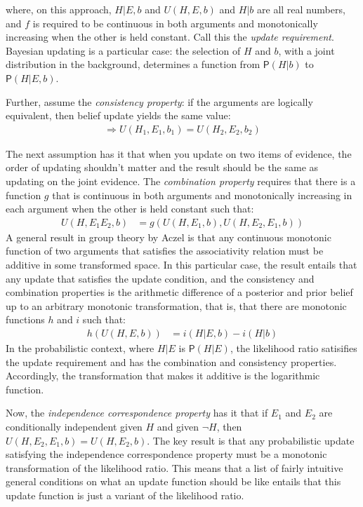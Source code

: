 \documentclass[
  10pt,
  dvipsnames,enabledeprecatedfontcommands]{scrartcl}
\newcommand{\n}{\neg}
\newcommand{\pr}[1]{\mathsf{P}(#1)}
\begin{document}
\noindent where, on this approach, \(H \vert E, b\) and \(U(H,E,b)\) and
\(H \vert b\) are all real numbers, and \(f\) is required to be
continuous in both arguments and monotonically increasing when the other
is held constant. Call this the \textit{update requirement}. Bayesian
updating is a particular case: the selection of \(H\) and \(b\), with a
joint distribution in the background, determines a function from
\(\pr{H \vert b}\) to \(\pr{H \vert E, b}\).

Further, assume the \textit{consistency property}: if the arguments are
logically equivalent, then belief update yields the same value:
\begin{align*}
[H_1 \Leftrightarrow H_2, E_1 \Leftrightarrow E_2] \Rightarrow U(H_1, E_1, b_1) = U(H_2, E_2, b_2)
\end{align*}

\noindent The next assumption has it that when you update on two items
of evidence, the order of updating shouldn't matter and the result
should be the same as updating on the joint evidence. The
\textit{combination property} requires that there is a function \(g\)
that is continuous in both arguments and monotonically increasing in
each argument when the other is held constant such that: \begin{align*}
U(H, E_1E_2,b) & =  g(U(H,E_1, b), U(H, E_2, E_1, b))
\end{align*} A general result in group theory by Aczel is that any
continuous monotonic function of two arguments that satisfies the
associativity relation must be additive in some transformed space. In
this particular case, the result entails that any update that satisfies
the update condition, and the consistency and combination properties is
the arithmetic difference of a posterior and prior belief up to an
arbitrary monotonic transformation, that is, that there are monotonic
functions \(h\) and \(i\) such that: \begin{align*}
h(U(H,E,b)) & = i(H\vert E, b) - i(H\vert b)
\end{align*} In the probabilistic context, where \(H\vert E\) is
\(\pr{H\vert E}\), the likelihood ratio satisifies the update
requirement and has the combination and consistency properties.
Accordingly, the transformation that makes it additive is the
logarithmic function.

Now, the \emph{independence correspondence property} has it that if
\(E_1\) and \(E_2\) are conditionally independent given \(H\) and given
\(\n H\), then \(U(H, E_2, E_1, b) = U(H, E_2, b)\). The key result is
that any probabilistic update satisfying the independence correspondence
property must be a monotonic transformation of the likelihood ratio.
This means that a list of fairly intuitive general conditions on what an
update function should be like entails that this update function is just
a variant of the likelihood ratio.
\end{document}
